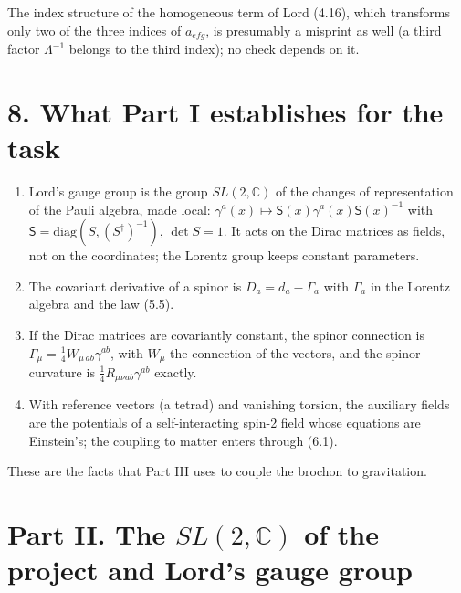 \documentclass[
  10pt,
]{article}
\providecommand{\tightlist}{%
  \setlength{\itemsep}{0pt}\setlength{\parskip}{0pt}}
\begin{document}
The index structure of the homogeneous term of Lord (4.16), which
transforms only two of the three indices of \(a_{efg}\), is presumably a
misprint as well (a third factor \(\Lambda^{-1}\) belongs to the third
index); no check depends on it.

\hypertarget{what-part-i-establishes-for-the-task}{%
\section{8. What Part I establishes for the
task}\label{what-part-i-establishes-for-the-task}}

\begin{enumerate}
\def\labelenumi{\arabic{enumi}.}
\tightlist
\item
  Lord's gauge group is the group \(SL(2,\mathbb C)\) of the changes of
  representation of the Pauli algebra, made local:
  \(\gamma^a(x)\mapsto\mathsf S(x)\gamma^a(x)\mathsf S(x)^{-1}\) with
  \(\mathsf S=\mathrm{diag}(S,(S^\dagger)^{-1})\), \(\det S=1\). It acts
  on the Dirac matrices as fields, not on the coordinates; the Lorentz
  group keeps constant parameters.
\item
  The covariant derivative of a spinor is \(D_a=d_a-\Gamma_a\) with
  \(\Gamma_a\) in the Lorentz algebra and the law (5.5).
\item
  If the Dirac matrices are covariantly constant, the spinor connection
  is \(\Gamma_\mu=\tfrac14W_{\mu\,ab}\gamma^{ab}\), with \(W_\mu\) the
  connection of the vectors, and the spinor curvature is
  \(\tfrac14R_{\mu\nu ab}\gamma^{ab}\) exactly.
\item
  With reference vectors (a tetrad) and vanishing torsion, the auxiliary
  fields are the potentials of a self-interacting spin-2 field whose
  equations are Einstein's; the coupling to matter enters through (6.1).
\end{enumerate}

These are the facts that Part III uses to couple the brochon to
gravitation.

\hypertarget{part-ii.-the-sl2mathbb-c-of-the-project-and-lords-gauge-group}{%
\section{\texorpdfstring{Part II. The \(SL(2,\mathbb C)\) of the project
and Lord's gauge
group}{Part II. The SL(2,\textbackslash mathbb C) of the project and Lord's gauge group}}\label{part-ii.-the-sl2mathbb-c-of-the-project-and-lords-gauge-group}}
\end{document}
